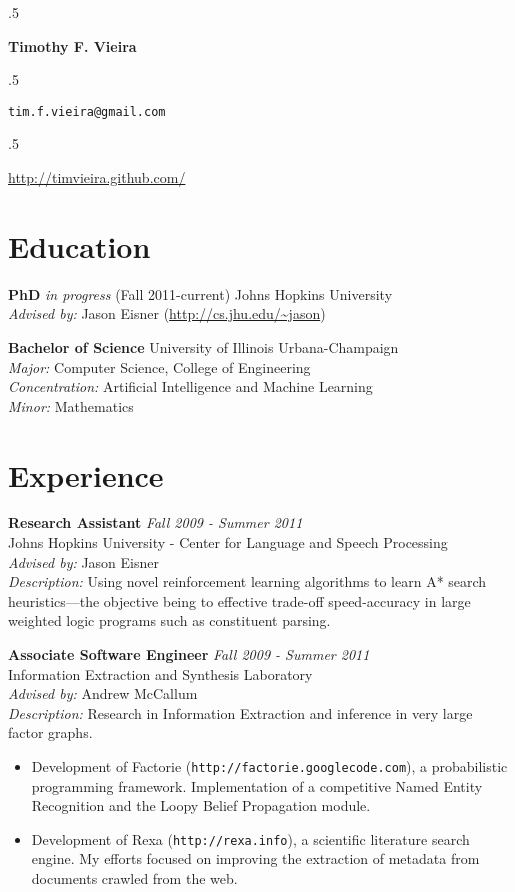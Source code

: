 \documentclass{report}
\newcommand{\centerheader}[1]{\moveleft.5\hoffset\centerline{#1}}
\begin{document}
{\vskip 0.1in}

{
  {\vskip 0.2in}
  \centerheader{\Large \bf Timothy F. Vieira}
  {\par
    {\vskip 0.1in}
    \centerheader{\texttt{tim.f.vieira@gmail.com}}
    \centerheader{\url{http://timvieira.github.com/}}
  }
  {\vskip 0.1in}
}
{\vskip -0.20in}


\section*{Education} 
{\bf PhD} \emph{in progress} (Fall 2011-current) Johns Hopkins University \\
{\sl Advised by:} Jason Eisner (\url{http://cs.jhu.edu/~jason})

{\bf Bachelor of Science} University of Illinois Urbana-Champaign \\
{\sl Major:} Computer Science, College of Engineering \\
{\sl Concentration:} Artificial Intelligence and Machine Learning \\
{\sl Minor:} Mathematics

\section*{Experience}
{\bf Research Assistant} \hfill {\it Fall 2009 - Summer 2011} \\
Johns Hopkins University - Center for Language and Speech Processing \\
{\sl Advised by:} Jason Eisner \\
{\sl Description:} Using novel reinforcement learning algorithms to learn A* search heuristics---the objective being to effective trade-off speed-accuracy in large weighted logic programs such as constituent parsing.

{\bf Associate Software Engineer} \hfill {\it Fall 2009 - Summer 2011} \\
Information Extraction and Synthesis Laboratory \\
{\sl Advised by:} Andrew McCallum \\
{\sl Description:} Research in Information Extraction and inference in very large factor graphs. 
\begin{itemize}
\item Development of Factorie (\texttt{http://factorie.googlecode.com}), a probabilistic programming framework. Implementation of a competitive Named Entity Recognition and the Loopy Belief Propagation module. 
\item Development of Rexa (\texttt{http://rexa.info}), a scientific literature search engine. My efforts focused on improving the extraction of metadata from documents crawled from the web.
\end{itemize}
\end{document}
